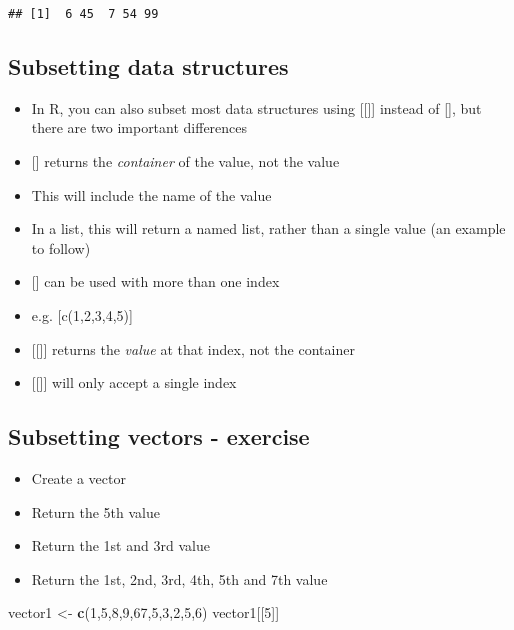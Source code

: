 \documentclass[]{article}
\newenvironment{Shaded}{\begin{snugshade}}{\end{snugshade}}
\newcommand{\KeywordTok}[1]{\textcolor[rgb]{0.13,0.29,0.53}{\textbf{#1}}}
\newcommand{\DecValTok}[1]{\textcolor[rgb]{0.00,0.00,0.81}{#1}}
\newcommand{\StringTok}[1]{\textcolor[rgb]{0.31,0.60,0.02}{#1}}
\newcommand{\NormalTok}[1]{#1}
\providecommand{\tightlist}{%
  \setlength{\itemsep}{0pt}\setlength{\parskip}{0pt}}
\begin{document}
\begin{verbatim}
## [1]  6 45  7 54 99
\end{verbatim}

\subsection{Subsetting data
structures}\label{subsetting-data-structures-2}

\begin{itemize}
\tightlist
\item
  In R, you can also subset most data structures using {[}{[}{]}{]}
  instead of {[}{]}, but there are two important differences
\item
  {[}{]} returns the \emph{container} of the value, not the value
\item
  This will include the name of the value
\item
  In a list, this will return a named list, rather than a single value
  (an example to follow)
\item
  {[}{]} can be used with more than one index
\item
  e.g. {[}c(1,2,3,4,5){]}
\item
  {[}{[}{]}{]} returns the \emph{value} at that index, not the container
\item
  {[}{[}{]}{]} will only accept a single index
\end{itemize}

\subsection{Subsetting vectors -
exercise}\label{subsetting-vectors---exercise}

\begin{itemize}
\tightlist
\item
  Create a vector
\item
  Return the 5th value
\item
  Return the 1st and 3rd value
\item
  Return the 1st, 2nd, 3rd, 4th, 5th and 7th value
\end{itemize}

\begin{Shaded}
\begin{Highlighting}[]
\NormalTok{vector1 <-}\StringTok{ }\KeywordTok{c}\NormalTok{(}\DecValTok{1}\NormalTok{,}\DecValTok{5}\NormalTok{,}\DecValTok{8}\NormalTok{,}\DecValTok{9}\NormalTok{,}\DecValTok{67}\NormalTok{,}\DecValTok{5}\NormalTok{,}\DecValTok{3}\NormalTok{,}\DecValTok{2}\NormalTok{,}\DecValTok{5}\NormalTok{,}\DecValTok{6}\NormalTok{)}
\NormalTok{vector1[[}\DecValTok{5}\NormalTok{]]}
\end{Highlighting}
\end{Shaded}
\end{document}
